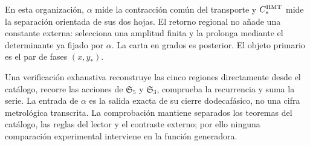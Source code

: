 En esta organización, \(\alpha\) mide la contracción común del transporte y
\(C_*^{\rm HMT}\) mide la separación orientada de sus dos hojas. El retorno
regional no añade una constante externa: selecciona una amplitud finita y la
prolonga mediante el determinante ya fijado por \(\alpha\). La carta en
grados es posterior. El objeto primario es el par de fases \((x,y_*)\).

Una verificación exhaustiva reconstruye las cinco regiones directamente
desde el catálogo, recorre las acciones de
\(\mathfrak S_5\) y \(\mathfrak S_3\), comprueba la recurrencia y suma la
serie. La entrada de \(\alpha\) es la salida exacta de su cierre
dodecafásico, no una cifra metrológica transcrita. La comprobación mantiene
separados los teoremas del catálogo, las reglas del lector y el contraste
externo; por ello ninguna comparación experimental interviene en la función
generadora.
